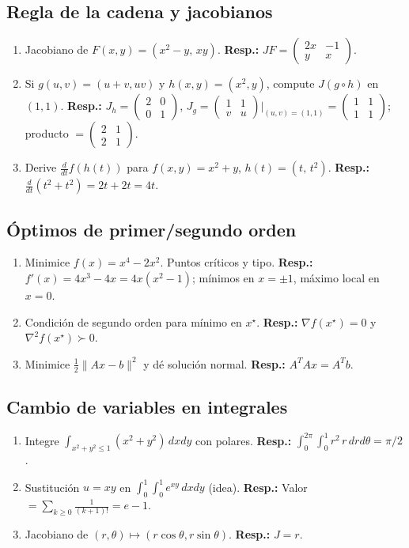	\subsection*{Regla de la cadena y jacobianos}
	\begin{enumerate}
		\item Jacobiano de $F(x,y)=(x^2-y,\,xy)$. \textbf{Resp.:} $JF=\begin{pmatrix}2x&-1\\ y&x\end{pmatrix}$.
		\item Si $g(u,v)=(u+v,uv)$ y $h(x,y)=(x^2,y)$, compute $J(g\circ h)$ en $(1,1)$. \textbf{Resp.:} $J_h=\begin{pmatrix}2&0\\0&1\end{pmatrix}$, $J_g=\begin{pmatrix}1&1\\ v&u\end{pmatrix}|_{(u,v)=(1,1)}=\begin{pmatrix}1&1\\1&1\end{pmatrix}$; producto $=\begin{pmatrix}2&1\\2&1\end{pmatrix}$.
		\item Derive $\frac{d}{dt}f(h(t))$ para $f(x,y)=x^2+y$, $h(t)=(t,\,t^2)$. \textbf{Resp.:} $\frac{d}{dt}(t^2+t^2)=2t+2t=4t$.
	\end{enumerate}
	
	\subsection*{Óptimos de primer/segundo orden}
	\begin{enumerate}
		\item Minimice $f(x)=x^4-2x^2$. Puntos críticos y tipo. \textbf{Resp.:} $f'(x)=4x^3-4x=4x(x^2-1)$; mínimos en $x=\pm1$, máximo local en $x=0$.
		\item Condición de segundo orden para mínimo en $x^\star$. \textbf{Resp.:} $\nabla f(x^\star)=0$ y $\nabla^2 f(x^\star)\succ0$.
		\item Minimice $\tfrac12\|Ax-b\|^2$ y dé solución normal. \textbf{Resp.:} $A^TAx=A^Tb$.
	\end{enumerate}
	
	\subsection*{Cambio de variables en integrales}
	\begin{enumerate}
		\item Integre $\int_{x^2+y^2\le1} (x^2+y^2)\,dxdy$ con polares. \textbf{Resp.:} $\int_0^{2\pi}\int_0^1 r^2\,r\,drd\theta=\pi/2$.
		\item Sustitución $u=xy$ en $\int_0^1\int_0^1 e^{xy}\,dxdy$ (idea). \textbf{Resp.:} Valor $=\sum_{k\ge0}\frac{1}{(k+1)!}=e-1$.
		\item Jacobiano de $(r,\theta)\mapsto (r\cos\theta, r\sin\theta)$. \textbf{Resp.:} $J=r$.
	\end{enumerate}
	

